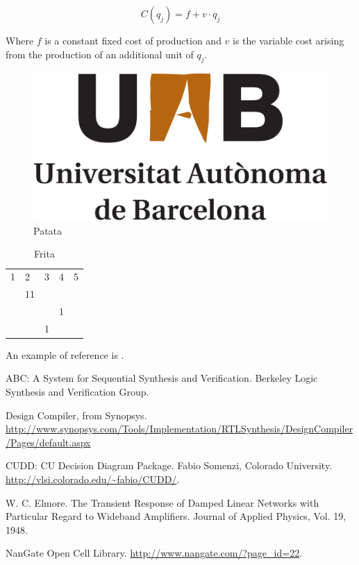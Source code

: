 \documentclass[12pt]{article}
\begin{document}
\begin{equation*}
C(q_j) = f + v \cdot q_j
\end{equation*}

Where $f$ is a constant fixed cost of production and $v$ is the variable cost arising from the production of an additional unit of $q_j$. 

\begin{figure}
\centering
\includegraphics[scale=0.5]{logo_uab}
\caption{Patata}
\end{figure}

\begin{table}[]
\begin{tabular}{lllll}
1 & 2  & 3 & 4 & 5 \\
  & 11 &   &   &   \\
  &    &   & 1 &   \\
  &    & 1 &   &  
\end{tabular}
\caption{Frita}
\end{table}

An example of reference is \cite{abc}.

\newpage
\begin{thebibliography}{9}

ABC: A System for Sequential Synthesis and Verification. Berkeley Logic Synthesis and Verification Group.
 
Design Compiler, from Synopsys. \url{http://www.synopsys.com/Tools/Implementation/RTLSynthesis/DesignCompiler/Pages/default.aspx}

CUDD: CU Decision Diagram Package. Fabio Somenzi, Colorado University. \url{http://vlsi.colorado.edu/~fabio/CUDD/}.

W. C. Elmore. The Transient Response of Damped Linear Networks with Particular Regard to Wideband Amplifiers. Journal of Applied Physics, Vol. 19, 1948.

NanGate Open Cell Library. \url{http://www.nangate.com/?page_id=22}.
\end{thebibliography}

\newpage
\listoffigures

\newpage
\listoftables

%
\end{document}
